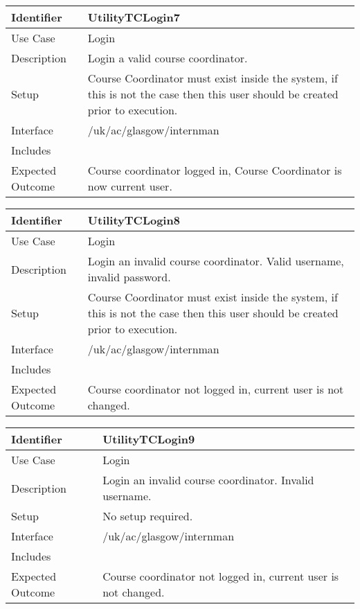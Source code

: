 \vspace{2em}

\begin{tabularx}{\textwidth}{|T|L|}
\hline
Identifier & UtilityTCLogin7\\
\hline
Use Case & Login \\
\hline
Description & Login a valid course coordinator. \\
\hline
Setup & Course Coordinator must exist inside the system, if this is
not the case then this user should be created prior to execution. \\
\hline
Interface & /uk/ac/glasgow/internman \\
\hline
Includes & \\
\hline
Expected Outcome & Course coordinator logged in, Course
Coordinator is now current user.\\
\hline
\end{tabularx}

\vspace{2em}

\begin{tabularx}{\textwidth}{|T|L|}
\hline
Identifier & UtilityTCLogin8\\
\hline
Use Case & Login \\
\hline
Description & Login an invalid course coordinator. Valid username,
invalid password. \\
\hline
Setup & Course Coordinator must exist inside the system, if this is
not the case then this user should be created prior to execution. \\
\hline
Interface & /uk/ac/glasgow/internman \\
\hline
Includes & \\
\hline
Expected Outcome & Course coordinator not logged in, current user is
not changed. \\
\hline
\end{tabularx}

\vspace{2em}

\begin{tabularx}{\textwidth}{|T|L|}
\hline
Identifier & UtilityTCLogin9\\
\hline
Use Case & Login \\
\hline
Description & Login an invalid course coordinator. Invalid username.\\
\hline
Setup & No setup required. \\
\hline
Interface & /uk/ac/glasgow/internman \\
\hline
Includes & \\
\hline
Expected Outcome & Course coordinator not logged in, current user is
not changed. \\
\hline
\end{tabularx}


